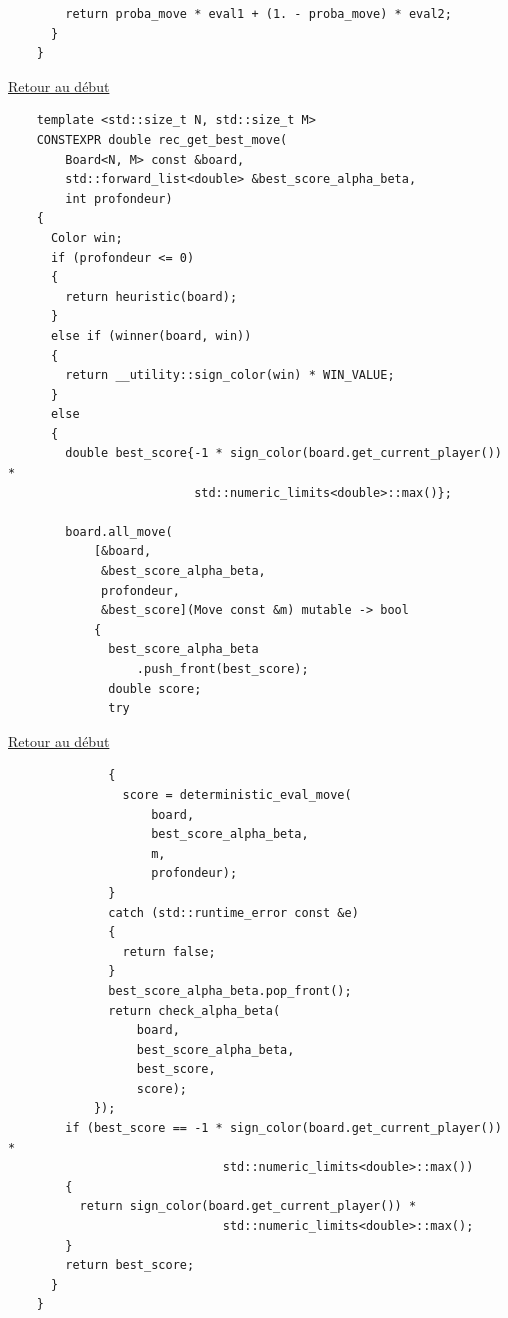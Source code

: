 {\begin{frame}[fragile]
\begin{verbatim}
        return proba_move * eval1 + (1. - proba_move) * eval2;
      }
    }

\end{verbatim}
\end{frame}

\begin{frame}[fragile]
\hyperlink{conclusion}{Retour au début}\newline
\begin{verbatim}
    template <std::size_t N, std::size_t M>
    CONSTEXPR double rec_get_best_move(
        Board<N, M> const &board,
        std::forward_list<double> &best_score_alpha_beta,
        int profondeur)
    {
      Color win;
      if (profondeur <= 0)
      {
        return heuristic(board);
      }
      else if (winner(board, win))
      {
        return __utility::sign_color(win) * WIN_VALUE;
      }
      else
      {
        double best_score{-1 * sign_color(board.get_current_player()) *
                          std::numeric_limits<double>::max()};

        board.all_move(
            [&board,
             &best_score_alpha_beta,
             profondeur,
             &best_score](Move const &m) mutable -> bool
            {
              best_score_alpha_beta
                  .push_front(best_score);
              double score;
              try
\end{verbatim}
\end{frame}

\begin{frame}[fragile]
\hyperlink{conclusion}{Retour au début}\newline
\begin{verbatim}
              {
                score = deterministic_eval_move(
                    board,
                    best_score_alpha_beta,
                    m,
                    profondeur);
              }
              catch (std::runtime_error const &e)
              {
                return false;
              }
              best_score_alpha_beta.pop_front();
              return check_alpha_beta(
                  board,
                  best_score_alpha_beta,
                  best_score,
                  score);
            });
        if (best_score == -1 * sign_color(board.get_current_player()) *
                              std::numeric_limits<double>::max())
        {
          return sign_color(board.get_current_player()) *
                              std::numeric_limits<double>::max();
        }
        return best_score;
      }
    }


\end{verbatim}
\end{frame}}
